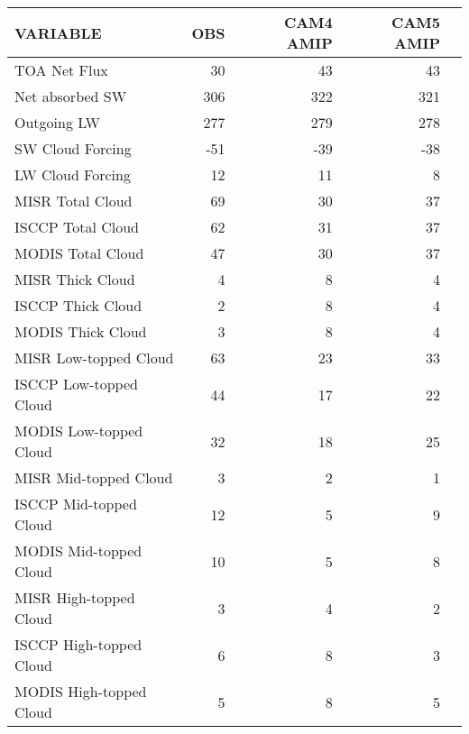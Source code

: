 \begin{tabular}{lrrrr}
\hline
                VARIABLE &                      OBS &                CAM4 AMIP &                CAM5 AMIP \\ \hline
            TOA Net Flux &                       30 &                       43 &                       43 \\
         Net absorbed SW &                      306 &                      322 &                      321 \\
             Outgoing LW &                      277 &                      279 &                      278 \\
        SW Cloud Forcing &                      -51 &                      -39 &                      -38 \\
        LW Cloud Forcing &                       12 &                       11 &                        8 \\
        MISR Total Cloud &                       69 &                       30 &                       37 \\
       ISCCP Total Cloud &                       62 &                       31 &                       37 \\
       MODIS Total Cloud &                       47 &                       30 &                       37 \\
        MISR Thick Cloud &                        4 &                        8 &                        4 \\
       ISCCP Thick Cloud &                        2 &                        8 &                        4 \\
       MODIS Thick Cloud &                        3 &                        8 &                        4 \\
   MISR Low-topped Cloud &                       63 &                       23 &                       33 \\
  ISCCP Low-topped Cloud &                       44 &                       17 &                       22 \\
  MODIS Low-topped Cloud &                       32 &                       18 &                       25 \\
   MISR Mid-topped Cloud &                        3 &                        2 &                        1 \\
  ISCCP Mid-topped Cloud &                       12 &                        5 &                        9 \\
  MODIS Mid-topped Cloud &                       10 &                        5 &                        8 \\
  MISR High-topped Cloud &                        3 &                        4 &                        2 \\
 ISCCP High-topped Cloud &                        6 &                        8 &                        3 \\
 MODIS High-topped Cloud &                        5 &                        8 &                        5 \\ \hline
\end{tabular}
